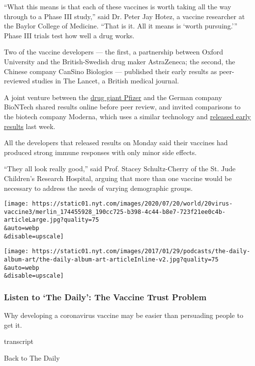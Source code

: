 ``What this means is that each of these vaccines is worth taking all the
way through to a Phase III study,'' said Dr. Peter Jay Hotez, a vaccine
researcher at the Baylor College of Medicine. ``That is it. All it means
is `worth pursuing.''' Phase III trials test how well a drug works.

Two of the vaccine developers --- the first, a partnership between
Oxford University and the British-Swedish drug maker AstraZeneca; the
second, the Chinese company CanSino Biologics --- published their early
results as peer-reviewed studies in The Lancet, a British medical
journal.

A joint venture between the
\href{https://www.nytimes.com/2020/07/22/us/politics/pfizer-coronavirus-vaccine.html}{drug
giant Pfizer} and the German company BioNTech shared results online
before peer review, and invited comparisons to the biotech company
Moderna, which uses a similar technology and
\href{https://www.nytimes.com/2020/07/14/health/cornavirus-vaccine-moderna.html}{released
early results} last week.

All the developers that released results on Monday said their vaccines
had produced strong immune responses with only minor side effects.

``They all look really good,'' said Prof. Stacey Schultz-Cherry of the
St. Jude Children's Research Hospital, arguing that more than one
vaccine would be necessary to address the needs of varying demographic
groups.

\texttt{[image: https://static01.nyt.com/images/2020/07/20/world/20virus-vaccine3/merlin\_174455928\_190cc725-b398-4c44-b8e7-723f21ee0c4b-articleLarge.jpg?quality=75\\\&auto=webp\\\&disable=upscale]}

\texttt{[image: https://static01.nyt.com/images/2017/01/29/podcasts/the-daily-album-art/the-daily-album-art-articleInline-v2.jpg?quality=75\\\&auto=webp\\\&disable=upscale]}

\hypertarget{listen-to-the-daily-the-vaccine-trust-problem}{%
\subsubsection{Listen to `The Daily': The Vaccine Trust
Problem}\label{listen-to-the-daily-the-vaccine-trust-problem}}

Why developing a coronavirus vaccine may be easier than persuading
people to get it.

transcript

Back to The Daily

